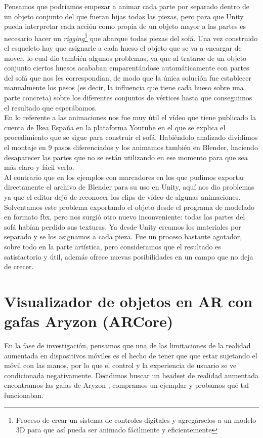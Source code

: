 Pensamos que podríamos empezar a animar cada parte por separado dentro de un objeto conjunto del que fueran hijas todas las piezas, pero para que Unity pueda interpretar cada acción como propia de un objeto mayor a las partes es necesario hacer un \textit{rigging}\footnote{ Proceso de crear un sistema de controles digitales y agregárselos a un modelo 3D para que así pueda ser animado fácilmente y eficientemente} que abarque todas piezas del sofá. Una vez construido el esqueleto hay que asignarle a cada hueso el objeto que se va a encargar de mover, lo cual dio también algunos problemas, ya que al tratarse de un objeto conjunto ciertos huesos acababan emparentándose automáticamente con partes del sofá que nos les correspondían, de modo que la única solución fue establecer manualmente los pesos (es decir, la influencia que tiene cada hueso sobre una parte concreta) sobre los diferentes conjuntos de vértices hasta que conseguimos el resultado que esperábamos.\\

En lo referente a las animaciones nos fue muy útil el vídeo que tiene publicado la cuenta de Ikea España en la plataforma Youtube \cite{IkeaYT} en el que se explica el procedimiento que se sigue para construir el sofá. Habiéndolo analizado dividimos el montaje en 9 pasos diferenciados y los animamos también en Blender, haciendo desaparecer las partes que no se están utilizando en ese momento para que sea más claro y fácil verlo.\\

Al contrario que en los ejemplos con marcadores en los que pudimos exportar directamente el archivo de Blender para su uso en Unity, aquí nos dio problemas ya que el editor dejó de reconocer los clips de vídeo de algunas animaciones. Solventamos este problema exportando el objeto desde el programa de modelado en formato fbx, pero nos surgió otro nuevo inconveniente: todas las partes del sofá habían perdido sus texturas. Ya desde Unity creamos los materiales por separado y se los asignamos a cada pieza.
Fue un proceso bastante agotador, sobre todo en la parte artística, pero consideramos que el resultado es satisfactorio y útil, además ofrece nuevas posibilidades en un campo que no deja de crecer.

\clearpage
\section{Visualizador de objetos en AR con gafas Aryzon (ARCore)}
En la fase de investigación, pensamos que una de las limitaciones de la realidad aumentada en dispositivos móviles es el hecho de tener que que estar sujetando el móvil con las manos, por lo que el control y la experiencia de usuario se ve condicionada negativamente. Decidimos buscar un headset de realidad aumentada encontramos las gafas de Aryzon \cite{Aryzon}, compramos un ejemplar y probamos qué tal funcionaban.\\

